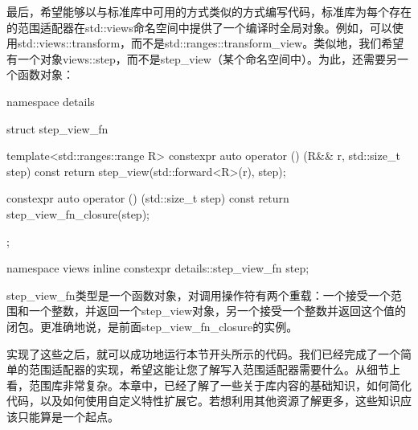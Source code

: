 最后，希望能够以与标准库中可用的方式类似的方式编写代码，标准库为每个存在的范围适配器在std::views命名空间中提供了一个编译时全局对象。例如，可以使用std::views::transform，而不是std::ranges::transform\_view。类似地，我们希望有一个对象views::step，而不是step\_view（某个命名空间中）。为此，还需要另一个函数对象：

\begin{cpp}
namespace details
{
	struct step_view_fn
	{
		template<std::ranges::range R>
		constexpr auto operator () (R&& r,
								    std::size_t step) const
		{
			return step_view(std::forward<R>(r), step);
		}
	
		constexpr auto operator () (std::size_t step) const
		{
			return step_view_fn_closure(step);
		}
	};
}

namespace views
{
	inline constexpr details::step_view_fn step;
}
\end{cpp}

step\_view\_fn类型是一个函数对象，对调用操作符有两个重载：一个接受一个范围和一个整数，并返回一个step\_view对象，另一个接受一个整数并返回这个值的闭包。更准确地说，是前面step\_view\_fn\_closure的实例。

实现了这些之后，就可以成功地运行本节开头所示的代码。我们已经完成了一个简单的范围适配器的实现，希望这能让您了解写入范围适配器需要什么。从细节上看，范围库非常复杂。本章中，已经了解了一些关于库内容的基础知识，如何简化代码，以及如何使用自定义特性扩展它。若想利用其他资源了解更多，这些知识应该只能算是一个起点。






























